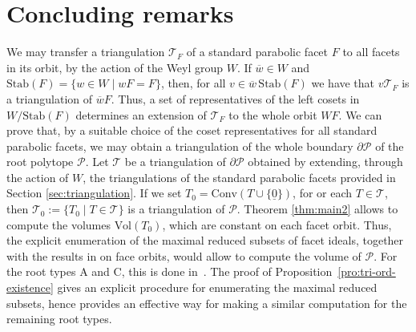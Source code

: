 \documentclass[10pt]{amsart}
\theoremstyle{definition}
\theoremstyle{remark}
\newcommand\ov{\overline}
\newcommand\mc{\mathcal}
\newcommand\nullvec{\underline 0}
\newcommand\pol{\mathcal P}
\newcommand\conv{\mathrm{Conv}}
\begin{document}
\section{Concluding remarks}\label{sec:concl}

We may transfer a triangulation $\mc T_F$ of a standard parabolic facet $F$ to all facets in its orbit, by the action of the Weyl group $W$. 
If $\ov w\in W$ and $\textrm{Stab}(F)=\{w\in W\mid wF=F\}$, then, for all $v \in \ov w\,\textrm{Stab}(F)$ we have that $v\mc T_F$ is a triangulation of $\ov wF$. 
Thus, a set of representatives of the left cosets in $W/\textrm{Stab}(F)$ determines an extension of $\mc T_F$ to the whole orbit $WF$.
We can prove that, by a suitable choice of the coset representatives for all standard parabolic facets, we may obtain a triangulation of the whole boundary $\partial\pol$ of the root polytope $\mc P$.
Let  $\mc T$ be a triangulation of $\partial \pol$ obtained by extending,  through the action of $W$,  the triangulations of the standard parabolic facets provided in Section \ref{sec:triangulation}.
If we set  $T_0=\conv(T\cup \{\nullvec\})$, for or each $T\in  \mc T$, then $\mc T_0:=\{T_0\mid T\in \mc T\}$ is a triangulation of $\pol$. 
Theorem \ref{thm:main2} allows to compute the volumes $\textrm{Vol}(T_0)$, which are constant on each facet orbit.  
Thus,  the explicit enumeration of the maximal reduced subsets of  facet ideals, together with the results in \cite{CM1} on face orbits, would allow to compute the volume of $\pol$.
For the root types $\mathrm A$ and $\mathrm C$, this is done in~\cite{CM2}. 
The proof of Proposition~\ref{pro:tri-ord-existence} gives an explicit procedure for enumerating the maximal reduced subsets, hence provides an effective way for making a similar computation for the remaining root types.
\end{document}
